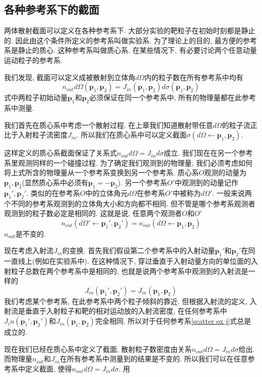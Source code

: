 \documentclass[a4paper,11pt]{book}
\newcommand{\pp}{\mathbf{p}}
\begin{document}
\subsection{各种参考系下的截面}
两体散射截面可以定义在各种参考系下. 大部分实验的靶粒子在初始时刻都是静止的. 因此由这个条件所定义的参考系叫做实验系. 为了理论上的目的, 最方便的参考系是静止的质心. 这种参考系叫做质心系. 在某些情况下, 有必要讨论两个任意动量运动粒子的参考系.

我们发现, 截面可以定义成被散射到立体角$d\Omega$内的粒子数在所有参考系中均有
\begin{equation*}
  n_{out}d\Omega(\pp_1,\pp_2)=J_{in}(\pp_1,\pp_2)d\sigma(\pp_1,\pp_2)
\end{equation*}
式中两粒子初始动量$\pp_1$和$\pp_2$必须保证在同一个参考系中, 所有的物理量都在此参考系中测量.

我们首先在质心系中考虑一个散射过程. 在上章我们知道散射带任意$d\Omega$的粒子流正比于入射粒子流密度$J_{in}$. 所以我们在质心系中可以定义截面$\sigma(d\Omega\leftarrow\pp_1,\pp_2)$.

这样定义的质心系截面保证了关系式$n_{out}d\Omega=J_{in}d\sigma$成立. 我们现在在另一个参考系里观测同样的一个碰撞过程. 为了确定我们观测到的物理量, 我们必须考虑如何将上式所含的物理量从一个参考系变换到另一个参考系. 质心系$O$观测的动量为$\pp_1,\pp_2$(显然质心系中必须有$\pp_1=-\pp_2$). 另一个参考系$O'$中观测到的动量记作$\pp_1',\pp_2'$. 类似的在参考系$O$中的立体角元$d\Omega$在参考系$O'$中被称为$d\Omega'$. 一般来说两个不同的参考系观测到的立体角大小和方向都不相同. 但不管是哪个参考系观测者观测到的粒子数必定是相同的. 这就是说, 任意两个观测者$O$和$O'$
\begin{equation*}
  n_{out}(d\Omega'\leftarrow\pp_1',\pp_2')=n_{out}(d\Omega\leftarrow\pp_1,\pp_2)
\end{equation*}
$n_{out}$是不变的.

现在考虑入射流$J_{in}$的变换. 首先我们假设第二个参考系中的入射动量$\pp_1'$和$\pp_2'$在同一直线上(例如在实验系中). 在这种情况下, 穿过垂直于入射动量方向的单位面的入射粒子总数在两个参考系中是相同的, 也就是说两个参考系中观测到的入射流是一样的
\begin{equation}\label{scatter ox j}
  J_{in}(\pp_1',\pp_2')=J_{in}(\pp_1,\pp_2)
\end{equation}
我们考虑某个参考系, 在此参考系中两个粒子倾斜的靠近. 但根据入射流的定义, 入射流是垂直于入射粒子和靶的相对运动放的入射流密度, 在任何参考系中$J_in(\pp_1',\pp_2')$和$J_{in}(\pp_1,\pp_2)$完全相同. 所以对于任何参考系\eqref{scatter ox j}式总是成立的.

现在我们已经在质心系中定义了截面, 散射粒子数密度由关系$n_{out}d\Omega=J_{in}d\sigma$给出. 而物理量$n_{out}$和$J_{in}$在所有参考系中测量到的结果是不变的. 所以我们可以在任意参考系中定义截面, 使得$n_{out}d\Omega=J_{in}d\sigma$. 用
\end{document}
